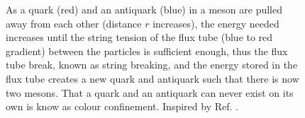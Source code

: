 \documentclass[../main.tex]{subfiles} %
\begin{document}
\begin{figure}[t]
    \centering
    \caption{As a quark (red) and an antiquark (blue) in a meson are pulled away from each other (distance $r$ increases), the energy needed increases until the string tension of the flux tube (blue to red gradient) between the particles is sufficient enough, thus the flux tube break, known as string breaking, and the energy stored in the flux tube creates a new quark and antiquark such that there is now two mesons. That a quark and an antiquark can never exist on its own is know as colour confinement. Inspired by Ref. \cite{institutoDeFisicaCorpuscular_numericalApproach_2016}.}

\end{figure}
\end{document}

